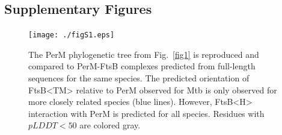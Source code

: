 \documentclass[pdflatex,sn-nature]{sn-jnl}%
\def\textsuperscript#1{<#1>}%
\newcommand\mtb{Mtb}
\newcommand\ftsbTM{FtsB\textsuperscript{TM}}
\newcommand\ftsbH{FtsB\textsuperscript{H}}
\begin{document}
\begin{appendices}

\section{Supplementary Figures}

\setcounter{figure}{0}

\renewcommand{\thefigure}{S\arabic{figure}}

\begin{figure}[htb]
\centering
\texttt{[image: ./figS1.eps]}
\caption{The PerM phylogenetic tree from Fig.~\ref{fig1} is reproduced and compared to PerM-FtsB complexes predicted from full-length sequences for the same species. The predicted orientation of \ftsbTM{} relative to PerM observed for \mtb{} is only observed for more closely related species (blue lines). However, \ftsbH{} interaction with PerM is predicted for all species. Residues with $pLDDT<50$ are colored gray.}\label{figS1}
\end{figure}


\end{appendices}
\end{document}

